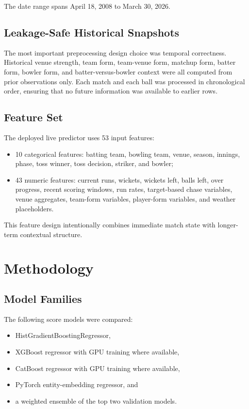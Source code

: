 \documentclass[conference]{IEEEtran}
\begin{document}
The date range spans April 18, 2008 to March 30, 2026.

\subsection{Leakage-Safe Historical Snapshots}
The most important preprocessing design choice was temporal correctness. Historical venue strength, team form, team-venue form, matchup form, batter form, bowler form, and batter-versus-bowler context were all computed from prior observations only. Each match and each ball was processed in chronological order, ensuring that no future information was available to earlier rows.

\subsection{Feature Set}
The deployed live predictor uses 53 input features:
\begin{itemize}
\item 10 categorical features: batting team, bowling team, venue, season, innings, phase, toss winner, toss decision, striker, and bowler;
\item 43 numeric features: current runs, wickets, wickets left, balls left, over progress, recent scoring windows, run rates, target-based chase variables, venue aggregates, team-form variables, player-form variables, and weather placeholders.
\end{itemize}

This feature design intentionally combines immediate match state with longer-term contextual structure.

\section{Methodology}
\subsection{Model Families}
The following score models were compared:
\begin{itemize}
\item HistGradientBoostingRegressor,
\item XGBoost regressor with GPU training where available,
\item CatBoost regressor with GPU training where available,
\item PyTorch entity-embedding regressor, and
\item a weighted ensemble of the top two validation models.
\end{itemize}
\end{document}

